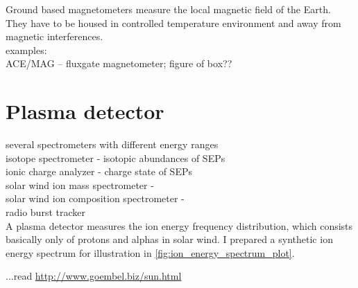 Ground based magnetometers measure the local magnetic field of the Earth. They have to be housed in controlled temperature environment and away from magnetic interferences.\\



examples:\\
ACE/MAG -- fluxgate magnetometer; figure of box??\\



\section{Plasma detector}
\label{sec:plasma_detector}

several spectrometers with different energy ranges\\

isotope spectrometer - isotopic abundances of SEPs\\
ionic charge analyzer - charge state of SEPs\\
solar wind ion mass spectrometer - \\
solar wind ion composition spectrometer - \\
radio burst tracker\\


A plasma detector measures the ion energy frequency distribution, which consists basically only of protons and alphas in solar wind. I prepared a synthetic ion energy spectrum for illustration in \autoref{fig:ion_energy_spectrum_plot}.\\
\begin{figure}[htb]
\end{figure}
...read \url{http://www.goembel.biz/sun.html}\\

